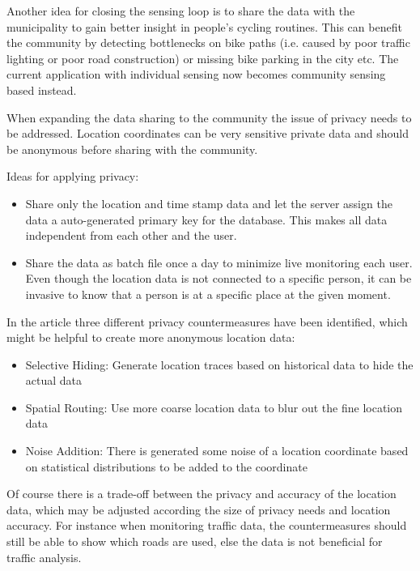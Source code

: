 Another idea for closing the sensing loop is to share the data with the municipality to gain better insight in people's cycling routines. This can benefit the community by detecting bottlenecks on bike paths (i.e. caused by poor traffic lighting or poor road construction) or missing bike parking in the city etc. 
The current application with individual sensing now becomes community sensing based instead.

When expanding the data sharing to the community the issue of privacy needs to be addressed. Location coordinates can be very sensitive private data and should be anonymous before sharing with the community.  

Ideas for applying privacy:
\begin{itemize}
    \item Share only the location and time stamp data and let the server assign the data a auto-generated primary key for the database. This makes all data independent from each other and the user.
    \item Share the data as batch file once a day to minimize live monitoring each user. Even though the location data is not connected to a specific person, it can be invasive to know that a person is at a specific place at the given moment.
\end{itemize}

In the article \cite{Mun2009} three different privacy countermeasures have been identified, which might be helpful to create more anonymous location data:
\begin{itemize}
    \item Selective Hiding: Generate location traces based on historical data to hide the actual data
    \item Spatial Routing: Use more coarse location data to blur out the fine location data
    \item Noise Addition: There is generated some noise of a location coordinate based on statistical distributions to be added to the coordinate
\end{itemize}

Of course there is a trade-off between the privacy and accuracy of the location data, which may be adjusted according the size of privacy needs and location accuracy. For instance when monitoring traffic data, the countermeasures should still be able to show which roads are used, else the data is not beneficial for traffic analysis.
